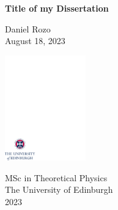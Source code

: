 \documentclass[12pt,a4paper]{report}
\begin{document}
\thispagestyle{empty}

%

\parindent=0pt          %
\parskip=5pt            %


\vspace*{0.1\textheight}

\begin{center}
        \huge{\bfseries Title of my Dissertation}\\ %
\end{center}

\medskip

\begin{center}
        \Large{Daniel Rozo}\\  %
        \medskip
        \large{August 18, 2023}  %
\end{center}


\vspace*{0.4\textheight}

\begin{center}
        \includegraphics[width=35mm]{Figures/crest.pdf}
\end{center}

\medskip

\begin{center}

\large{
  MSc in Theoretical Physics\\[0.8ex]
  The University of Edinburgh\\[0.8ex]
  2023
}

\end{center}
\end{document}
